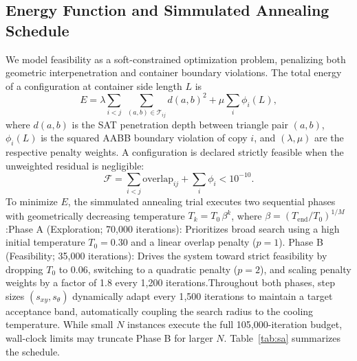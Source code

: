 \documentclass[10pt]{article}
\begin{document}
\subsection{Energy Function and Simmulated Annealing Schedule}
We model feasibility as a soft-constrained optimization problem, penalizing both 
geometric interpenetration and container boundary violations. 
The total energy of a configuration at container side length
 $L$ is$$E = \lambda \sum_{i<j}\;\sum_{(a,b)\in\mathcal{T}_{ij}}d(a,b)^{2} + \mu \sum_i \phi_i(L), \label{eq:energy}$$
 where $d(a,b)$ is the SAT penetration depth between triangle pair $(a, b)$, $\phi_i(L)$ is the squared AABB 
 boundary violation of copy $i$, and $(\lambda, \mu)$ are the respective penalty weights. A configuration
  is declared strictly feasible when the unweighted residual is negligible:
  $$\mathcal{F} = \sum_{i<j} \text{overlap}_{ij} + \sum_i \phi_i < 10^{-10}.$$To minimize $E$, the simmulated annealing trial 
  executes two sequential phases with geometrically decreasing temperature
   $T_k = T_0\,\beta^k$, where $\beta = (T_{\mathrm{end}}/T_0)^{1/M}$:Phase A (Exploration; 70{,}000 iterations): 
   Prioritizes broad search using a high initial temperature $T_0 = 0.30$ and a linear overlap penalty ($p = 1$).
   Phase B (Feasibility; 35{,}000 iterations): Drives the system toward strict feasibility 
   by dropping $T_0$ to $0.06$, switching to a quadratic penalty ($p = 2$), and scaling penalty weights by 
   a factor of 1.8 every 1{,}200 iterations.Throughout both phases, step sizes $(s_{xy}, s_\theta)$ 
   dynamically adapt every 1{,}500 iterations to maintain a target acceptance band, automatically coupling 
   the search radius to the cooling temperature. While small $N$ instances execute the full
    105{,}000-iteration budget, wall-clock limits may truncate Phase B for larger $N$. Table~\ref{tab:sa} 
    summarizes the schedule.
\end{document}
